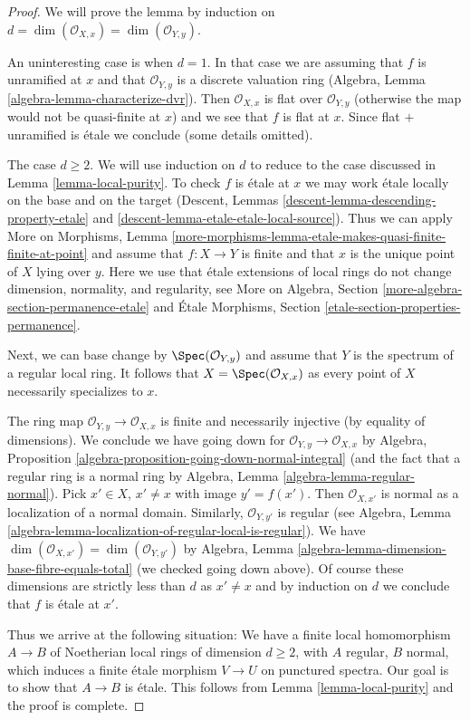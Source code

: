 \begin{proof}
We will prove the lemma by induction on
$d = \dim(\mathcal{O}_{X, x}) = \dim(\mathcal{O}_{Y, y})$.

\medskip\noindent
An uninteresting case is when $d = 1$.
In that case we are assuming that $f$ is unramified at $x$
and that $\mathcal{O}_{Y, y}$ is a discrete valuation ring
(Algebra, Lemma \ref{algebra-lemma-characterize-dvr}).
Then $\mathcal{O}_{X, x}$ is flat over $\mathcal{O}_{Y, y}$
(otherwise the map would not be quasi-finite at $x$)
and we see that $f$ is flat at $x$. Since flat $+$
unramified is \'etale we conclude (some details omitted).

\medskip\noindent
The case $d \geq 2$. We will use induction on $d$ to reduce
to the case discussed in Lemma \ref{lemma-local-purity}.
To check $f$ is \'etale at $x$ we may work \'etale locally
on the base and on the target
(Descent, Lemmas \ref{descent-lemma-descending-property-etale} and
\ref{descent-lemma-etale-etale-local-source}).
Thus we can apply More on Morphisms, Lemma
\ref{more-morphisms-lemma-etale-makes-quasi-finite-finite-at-point}
and assume that $f : X \to Y$ is finite and that $x$ is the unique
point of $X$ lying over $y$. Here we use that \'etale extensions of
local rings do not change dimension, normality, and regularity, see
More on Algebra, Section \ref{more-algebra-section-permanence-etale}
and
\'Etale Morphisms, Section \ref{etale-section-properties-permanence}.

\medskip\noindent
Next, we can base change by $\Spec(\mathcal{O}_{Y, y})$
and assume that $Y$ is the spectrum of a regular local ring.
It follows that $X = \Spec(\mathcal{O}_{X, x})$ as
every point of $X$ necessarily specializes to $x$.

\medskip\noindent
The ring map $\mathcal{O}_{Y, y} \to \mathcal{O}_{X, x}$ is
finite and necessarily injective (by equality of dimensions).
We conclude we have going down for
$\mathcal{O}_{Y, y} \to \mathcal{O}_{X, x}$ by
Algebra, Proposition \ref{algebra-proposition-going-down-normal-integral}
(and the fact that a regular ring is a normal ring by
Algebra, Lemma \ref{algebra-lemma-regular-normal}).
Pick $x' \in X$, $x' \not = x$ with image $y' = f(x')$.
Then $\mathcal{O}_{X, x'}$ is normal as a localization
of a normal domain. Similarly, $\mathcal{O}_{Y, y'}$ is
regular (see Algebra, Lemma
\ref{algebra-lemma-localization-of-regular-local-is-regular}).
We have $\dim(\mathcal{O}_{X, x'}) = \dim(\mathcal{O}_{Y, y'})$ by
Algebra, Lemma \ref{algebra-lemma-dimension-base-fibre-equals-total}
(we checked going down above).
Of course these dimensions are strictly less than $d$ as $x' \not = x$
and by induction on $d$ we conclude that $f$ is \'etale at $x'$.

\medskip\noindent
Thus we arrive at the following situation: We have a finite
local homomorphism $A \to B$ of Noetherian local rings
of dimension $d \geq 2$, with $A$ regular, $B$ normal, which
induces a finite \'etale morphism $V \to U$ on punctured spectra.
Our goal is to show that $A \to B$ is \'etale.
This follows from Lemma \ref{lemma-local-purity}
and the proof is complete.
\end{proof}

